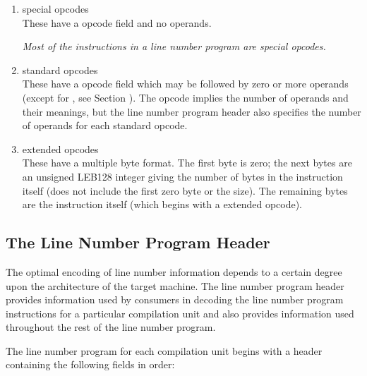 \begin{enumerate}[1. ]
\item special opcodes \\
These have a \HFTubyte{} opcode field and no operands.\vspace{1ex}

\textit{Most of the instructions in a 
line number program are special opcodes.}

\item standard opcodes \\
These have a \HFTubyte{} opcode field which may be followed by zero or more
 operands (except for 
\mbox{\DWLNSfixedadvancepc,} see 
Section ).
The opcode implies the number of operands and their meanings, but the
line number program header also specifies the number of operands for
each standard opcode.

\item extended opcodes \\
These have a multiple byte format. The first byte is zero; the next bytes
are an unsigned LEB128 integer giving the number of bytes in the
instruction itself (does not include the first zero byte or the size). The
remaining bytes are the instruction itself (which begins with a \HFTubyte{}
extended opcode). \\
\end{enumerate}


\subsection{The Line Number Program Header}
\label{chap:linenumberprogramheader}
The optimal encoding of line number information depends to a
certain degree upon the architecture of the target machine. The
line number program header provides information used by
consumers in decoding the line number program instructions for
a particular compilation unit and also provides information
used throughout the rest of the line number program.

The line number program for each compilation unit begins with
a header containing the following fields in order:

